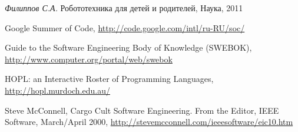 \documentclass[a4paper]{article}
\begin{document}
\begin{thebibliography}{9001}
   \emph{Филиппов С.А.} Робототехника для детей и родителей, Наука, 2011

   Google Summer of Code, \url{http://code.google.com/intl/ru-RU/soc/}

   Guide to the Software Engineering Body of Knowledge (SWEBOK), \url{http://www.computer.org/portal/web/swebok}
  
   HOPL: an Interactive Roster of Programming Languages,  \url{http://hopl.murdoch.edu.au/}
  
   Steve McConnell, Cargo Cult Software Engineering. From the Editor, IEEE Software, March/April 2000, \url{http://stevemcconnell.com/ieeesoftware/eic10.htm}


\end{thebibliography}
\end{document}

